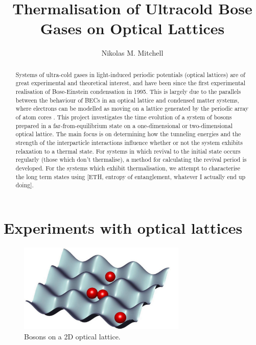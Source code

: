 \documentclass[a4paper,10pt]{article}
\title{Thermalisation of Ultracold Bose Gases on Optical Lattices}
\author{Nikolas M. Mitchell}
\begin{document}
\maketitle

\begin{abstract}

Systems of ultra-cold gases in light-induced periodic potentials (optical lattices) are of great experimental and theoretical interest, and have been since the first experimental 
realisation of Bose-Einstein condensation in 1995. 
This is largely due to the parallels between the behaviour of BECs in an optical lattice and condensed matter systems, where 
electrons can be modelled as moving on a lattice generated by the periodic array of atom cores \cite{Bloch2012}. This project 
investigates the time evolution of a system of bosons prepared in a far-from-equilibrium state on a one-dimensional or two-dimensional
optical lattice. The main focus is on determining how the tunneling energies and the strength of the interparticle interactions influence
whether or not the system exhibits relaxation to a thermal state. For systems in which revival to the initial state occurs regularly (those which don't thermalise), 
a method for calculating the revival period is developed. For the systems which exhibit thermalisation, we attempt to characterise the long term
states using [ETH, entropy of entanglement, whatever I actually end up doing].



\end{abstract}
\newpage
\section{Experiments with optical lattices}
 
\begin{figure}[H]
 \begin{center}
   \includegraphics[width=8cm]{bosons_on_lattice}
 \end{center}
 \caption{Bosons on a 2D optical lattice.}
 \end{figure}
\end{document}
